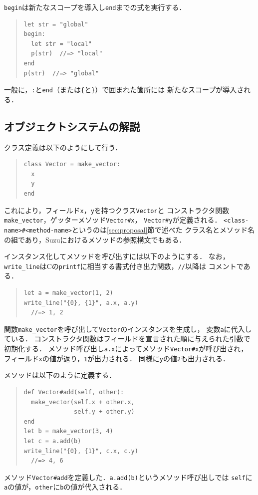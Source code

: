 \documentclass{ipsjprosym}
\begin{document}
\verb|begin|は新たなスコープを導入し\verb|end|までの式を実行する．
\begin{quote}
\begin{verbatim}
let str = "global"
begin:
  let str = "local"
  p(str)  //=> "local"
end
p(str)  //=> "global"
\end{verbatim}
\end{quote}
一般に，\verb|:|と\verb|end|（または\verb|{|と\verb|}|）で囲まれた箇所には
新たなスコープが導入される．

\subsection{オブジェクトシステムの解説}

クラス定義は以下のようにして行う．
\begin{quote}
\begin{verbatim}
class Vector = make_vector:
  x
  y
end
\end{verbatim}
\end{quote}
これにより，フィールド\verb|x|，\verb|y|を持つクラス\verb|Vector|と
コンストラクタ関数\verb|make_vector|，ゲッターメソッド\verb|Vector#x|，
\verb|Vector#y|が定義される．
\verb|<class-name>#<method-name>|というのは\ref{sec:proposal}節で述べた
クラス名とメソッド名の組であり，Suzuにおけるメソッドの参照構文でもある．

インスタンス化してメソッドを呼び出すには以下のようにする．
なお，\verb|write_line|はCの\verb|printf|に相当する書式付き出力関数，\verb|//|以降は
コメントである．
\begin{quote}
\begin{verbatim}
let a = make_vector(1, 2)
write_line("{0}, {1}", a.x, a.y)
  //=> 1, 2
\end{verbatim}
\end{quote}
関数\verb|make_vector|を呼び出して\verb|Vector|のインスタンスを生成し，
変数\verb|a|に代入している．
コンストラクタ関数はフィールドを宣言された順に与えられた引数で初期化する．
メソッド呼び出し\verb|a.x|によってメソッド\verb|Vector#x|が呼び出され，
フィールド\verb|x|の値が返り，\verb|1|が出力される．
同様に\verb|y|の値\verb|2|も出力される．

メソッドは以下のように定義する．
\begin{quote}
\begin{verbatim}
def Vector#add(self, other):
  make_vector(self.x + other.x,
              self.y + other.y)
end
let b = make_vector(3, 4)
let c = a.add(b)
write_line("{0}, {1}", c.x, c.y)
  //=> 4, 6 
\end{verbatim}
\end{quote}
メソッド\verb|Vector#add|を定義した．\verb|a.add(b)|というメソッド呼び出しでは
\verb|self|に\verb|a|の値が，\verb|other|に\verb|b|の値が代入される．
\end{document}
